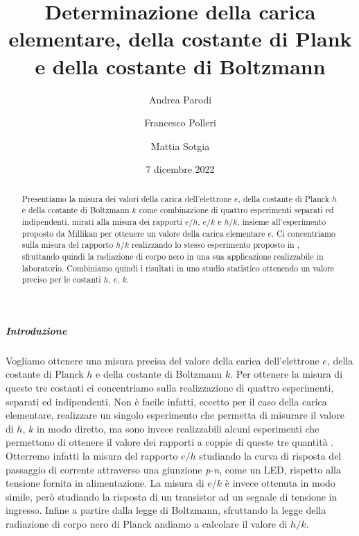 \documentclass[a4paper, varvw, nofootinbib]{revtex4-2}
\begin{document}
\title{Determinazione della carica elementare, della costante di Plank e della costante di Boltzmann}
\author{Andrea Parodi}
\author{Francesco Polleri}
\author{Mattia Sotgia}
\date{7 dicembre 2022}

\begin{abstract}
Presentiamo la misura dei valori della carica dell'elettrone $e$, della costante di Planck $h$ e della costante di Boltzmann $k$ come combinazione di quattro esperimenti separati ed indipendenti, mirati alla misura dei rapporti $e/h$, $e/k$ \cite{inmanMeasurementIntroductoryPhysics1973} e $h/k$, insieme all'esperimento proposto da Millikan \cite{millikanIsolationIonPrecision1911} per ottenere un valore della carica elementare $e$. Ci concentriamo sulla misura del rapporto $h/k$ realizzando lo stesso esperimento proposto in \cite{crandallMinimalApparatusDetermination1983}, sfruttando quindi la radiazione di corpo nero in una sua applicazione realizzabile in laboratorio. Combiniamo quindi i risultati in uno studio statistico ottenendo un valore preciso per le costanti $h$, $e$, $k$.
\end{abstract}

\maketitle

\subparagraph*{Introduzione} Vogliamo ottenere una misura precisa del valore della carica dell'elettrone $e$, della costante di Planck $h$ e della costante di Boltzmann $k$. Per ottenere la misura di queste tre costanti ci concentriamo sulla realizzazione di quattro esperimenti, separati ed indipendenti. Non è facile infatti, eccetto per il caso della carica elementare, realizzare un singolo esperimento che permetta di misurare il valore di $h$, $k$ in modo diretto, ma sono invece realizzabili alcuni esperimenti che permettono di ottenere il valore dei rapporti a coppie di queste tre quantità \cite{inmanMeasurementIntroductoryPhysics1973, millikanIsolationIonPrecision1911, crandallMinimalApparatusDetermination1983}. Otterremo infatti la misura del rapporto $e/h$ studiando la curva di risposta del passaggio di corrente attraverso una giunzione \emph{p-n}, come un {LED}, rispetto alla tensione fornita in alimentazione. La misura di $e/k$ è invece ottenuta in modo simile, però studiando la risposta di un transistor ad un segnale di tensione in ingresso. Infine a partire dalla legge di Boltzmann, sfruttando la legge della radiazione di corpo nero di Planck andiamo a calcolare il valore di $h/k$. 
\end{document}
